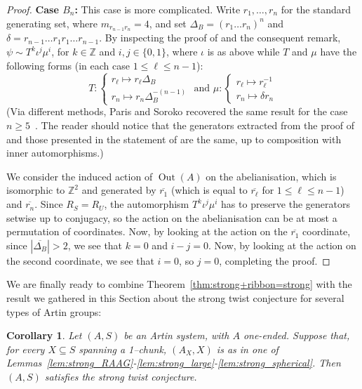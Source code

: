 \documentclass[svgnames]{amsart}
\theoremstyle{plain}
\newtheorem{cor}[thm]{Corollary}
\theoremstyle{definition}
\newcommand{\out}[1]{\operatorname{Out}(#1)}
\begin{document}
\begin{proof}
    \textbf{Case $B_n$:} This case is more complicated. Write $r_1, \dots, r_n$ for the standard generating set, where $m_{r_{n-1}r_n} = 4$, and set $\Delta_B = (r_1 \dots r_n)^n$ and $\delta = r_{n-1}\dots r_1 r_1 \dots r_{n-1}$. By inspecting the proof of \cite[Proposition~10]{charney2005automorphism} and the consequent remark, $\psi \sim T^k\iota^j\mu^i$, for $k \in \mathbb{Z}$ and $i, j \in \{0,1\}$, where $\iota$ is as above while $T$ and $\mu$ have the following forms (in each case $1 \leq \ell \leq n-1$):
    \[
    T\colon
    \begin{cases}
        r_\ell  \mapsto r_\ell\Delta_B\\
        r_n     \mapsto r_n\Delta_B^{-(n-1)}
    \end{cases}
    \text{ and }
    \mu\colon
    \begin{cases}
        r_\ell  \mapsto r_\ell^{-1}\\
        r_n     \mapsto \delta r_n
    \end{cases}
    \]
   (Via different methods, Paris and Soroko recovered the same result for the case $n\ge5$~\cite[Corollary 2.6]{paris2025endomorphisms}. The reader should notice that the generators extracted from the proof of \cite[Proposition~10]{charney2005automorphism} and those presented in the statement of \cite[Corollary 2.6]{paris2025endomorphisms} are the same, up to composition with inner automorphisms.)

    We consider the induced action of $\out{A}$ on the abelianisation, which is isomorphic to $\mathbb{Z}^2$ and generated by $\overline{r_1}$ (which is equal to $\overline{r_\ell}$ for $1 \leq \ell \leq n-1$) and $\overline{r_n}$. Since $R_S=R_U$, the automorphism $T^k\iota^j\mu^i$ has to preserve the generators setwise up to conjugacy, so the action on the abelianisation can be at most a permutation of coordinates. Now, by looking at the action on the $\overline{r_1}$ coordinate, since $|\overline{\Delta_B}| > 2$, we see that $k = 0$ and $i-j = 0$. Now, by looking at the action on the second coordinate, we see that $i = 0$, so $j = 0$, completing the proof. \end{proof}


We are finally ready to combine Theorem~\ref{thm:strong+ribbon=strong} with the result we gathered in this Section about the strong twist conjecture for several types of Artin groups:
\begin{cor}\label{cor:strong_twist_for_strong_chunks}
    Let $(A,S)$ be an Artin system, with $A$ one-ended. Suppose that, for every $X\subseteq S$ spanning a 1--chunk, $(A_X,X)$ is as in one of Lemmas~\ref{lem:strong_RAAG}-\ref{lem:strong_large}-\ref{lem:strong_spherical}. Then $(A,S)$ satisfies the strong twist conjecture.
\end{cor}
\end{document}
